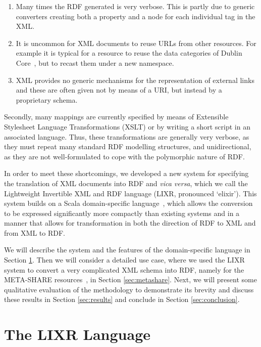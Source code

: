 \documentclass{acm_proc_article-sp}
\begin{document}
\begin{enumerate}
\item Many times the RDF generated is very verbose. This is partly due to generic
converters creating both a property and a node for each individual tag in the XML.
\item It is uncommon for XML documents to reuse URLs from other resources. For
example it is typical for a resource to reuse the data categories of Dublin Core~\cite{weibel1998dublin}, 
but to recast them under a new namespace.
\item XML provides no generic mechanisms for the representation of external links
and these are often given not by means of a URI, but instead by a proprietary schema.
\end{enumerate}

Secondly, many mappings are currently specified by means of Extensible Stylesheet Language
Transformations (XSLT) or 
by writing a short script in an associated language. Thus, these transformations
are generally very verbose, as they must repeat many standard RDF modelling
structures, and unidirectional, as they are not well-formulated to cope with the 
polymorphic nature of RDF.

In order to meet these shortcomings, we developed a new system for specifying the
translation of XML documents into RDF and \emph{vica versa}, which we call the Lightweight Invertible
XML and RDF language (LIXR, pronounced `elixir'). This system builds on a 
Scala domain-specific language~\cite[DSL]{fowler2010domain,wampler2008programming}, which allows the conversion to be
expressed significantly more compactly than existing systems and in a manner
that allows for transformation in both the direction of RDF to XML and from XML
to RDF.

We will describe the system and the features of the domain-specific language in Section
\ref{sec:dsl}. Then we will consider a detailed use case, where we used the LIXR
system to convert a very complicated XML schema into RDF, namely for the META-SHARE
resources~\cite{mccrae2015ontology,piperidis2012meta}, in Section \ref{sec:metashare}. Next, we will present some qualitative evaluation
of the methodology to demonstrate its brevity and discuss these results in Section
\ref{sec:results} and conclude in Section \ref{sec:conclusion}.

\section{The LIXR Language}
\label{sec:dsl}
\end{document}
